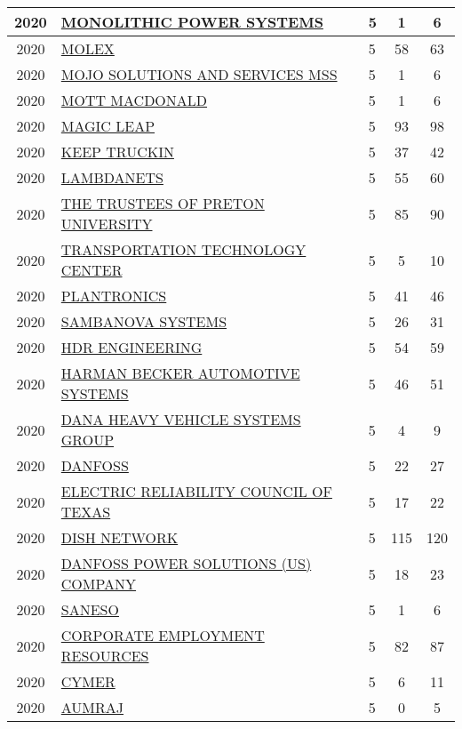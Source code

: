 \documentclass{article}%
\begin{document}
\begin{longtable}{c|p{20em}|p{5em}|c|c}
\hline%
2020&\hyperref[subsec:MONOLITHICPOWERSYSTEMS]{MONOLITHIC POWER SYSTEMS}&5&1&6\\%
\hline%
2020&\hyperref[subsec:MOLEX]{MOLEX}&5&58&63\\%
\hline%
2020&\hyperref[subsec:MOJOSOLUTIONSANDSERVICESMSS]{MOJO SOLUTIONS AND SERVICES MSS}&5&1&6\\%
\hline%
2020&\hyperref[subsec:MOTTMACDONALD]{MOTT MACDONALD}&5&1&6\\%
\hline%
2020&\hyperref[subsec:MAGICLEAP]{MAGIC LEAP}&5&93&98\\%
\hline%
2020&\hyperref[subsec:KEEPTRUCKIN]{KEEP TRUCKIN}&5&37&42\\%
\hline%
2020&\hyperref[subsec:LAMBDANETS]{LAMBDANETS}&5&55&60\\%
\hline%
2020&\hyperref[subsec:THETRUSTEESOFPRETONUNIVERSITY]{THE TRUSTEES OF PRETON UNIVERSITY}&5&85&90\\%
\hline%
2020&\hyperref[subsec:TRANSPORTATIONTECHNOLOGYCENTER]{TRANSPORTATION TECHNOLOGY CENTER}&5&5&10\\%
\hline%
2020&\hyperref[subsec:PLANTRONICS]{PLANTRONICS}&5&41&46\\%
\hline%
2020&\hyperref[subsec:SAMBANOVASYSTEMS]{SAMBANOVA SYSTEMS}&5&26&31\\%
\hline%
2020&\hyperref[subsec:HDRENGINEERING]{HDR ENGINEERING}&5&54&59\\%
\hline%
2020&\hyperref[subsec:HARMANBECKERAUTOMOTIVESYSTEMS]{HARMAN BECKER AUTOMOTIVE SYSTEMS}&5&46&51\\%
\hline%
2020&\hyperref[subsec:DANAHEAVYVEHICLESYSTEMSGROUP]{DANA HEAVY VEHICLE SYSTEMS GROUP}&5&4&9\\%
\hline%
2020&\hyperref[subsec:DANFOSS]{DANFOSS}&5&22&27\\%
\hline%
2020&\hyperref[subsec:ELECTRICRELIABILITYCOUNCILOFTEXAS]{ELECTRIC RELIABILITY COUNCIL OF TEXAS}&5&17&22\\%
\hline%
2020&\hyperref[subsec:DISHNETWORK]{DISH NETWORK}&5&115&120\\%
\hline%
2020&\hyperref[subsec:DANFOSSPOWERSOLUTIONS(US)COMPANY]{DANFOSS POWER SOLUTIONS (US) COMPANY}&5&18&23\\%
\hline%
2020&\hyperref[subsec:SANESO]{SANESO}&5&1&6\\%
\hline%
2020&\hyperref[subsec:CORPORATEEMPLOYMENTRESOURCES]{CORPORATE EMPLOYMENT RESOURCES}&5&82&87\\%
\hline%
2020&\hyperref[subsec:CYMER]{CYMER}&5&6&11\\%
\hline%
2020&\hyperref[subsec:AUMRAJ]{AUMRAJ}&5&0&5\\%

\end{longtable}
\end{document}
